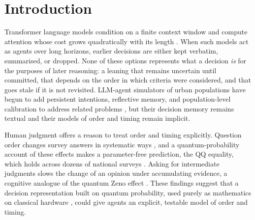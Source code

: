\documentclass[11pt]{article}
\theoremstyle{definition}
\theoremstyle{remark}
\begin{document}
\begin{abstract}
transcript, but not cheaper than a small model doing so at 10 sessions or with infrequent answers, less accurate than the large-model transcript, and no more accurate when the stronger model answered from the state. A noise-stability analysis of the decision state, adapting the correlated-noise definition of \citet{haris2026noise}, explains much of this: even with exact extraction the state's decision agrees with an order-independent additive rule only 69\% of the time at 10 sessions and at chance (48\%) at 30, because non-commuting rotations make the decision depend mainly on recent evidence; small rotations restore about 90\% agreement at the cost of the order effects the framework is built to produce. We state which claims are mathematical facts, which are physics results used by analogy, and which are cognitive hypotheses, and we give preregistrable human and agent experiments, with an open simulation package, to test the latter.
\end{abstract}

\section{Introduction}
\label{sec:intro}

Transformer language models condition on a finite context window and compute attention whose cost grows quadratically with its length \citep{vaswani2017}. When such models act as agents over long horizons, earlier decisions are either kept verbatim, summarised, or dropped. None of these options represents what a decision \emph{is} for the purposes of later reasoning: a leaning that remains uncertain until committed, that depends on the order in which criteria were considered, and that goes stale if it is not revisited. LLM-agent simulators of urban populations have begun to add persistent intentions, reflective memory, and population-level calibration to address related problems \citep{bougie2026cityreal,li2025narrative}, but their decision memory remains textual and their models of order and timing remain implicit.

Human judgment offers a reason to treat order and timing explicitly. Question order changes survey answers in systematic ways \citep{moore2002}, and a quantum-probability account of these effects makes a parameter-free prediction, the QQ equality, which holds across dozens of national surveys \citep{wang2013,wang2014}. Asking for intermediate judgments slows the change of an opinion under accumulating evidence, a cognitive analogue of the quantum Zeno effect \citep{yearsley2016}. These findings suggest that a decision representation built on quantum probability, used purely as mathematics on classical hardware \citep{busemeyer2012book,pothos2013}, could give agents an explicit, testable model of order and timing.
\end{document}
